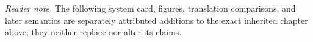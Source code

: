 \noindent\textit{Reader note.} The following system card, figures, translation
comparisons, and later semantics are separately attributed additions to
the exact inherited chapter above; they neither replace nor alter its claims.

